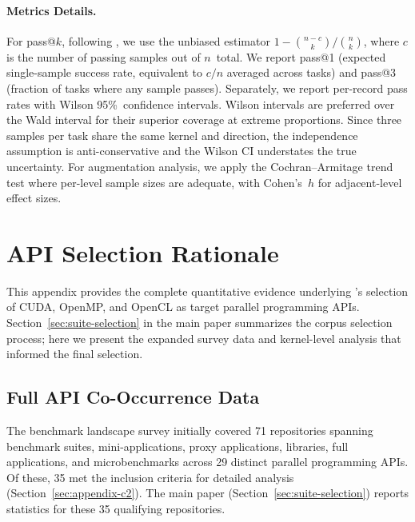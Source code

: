 \paragraph{Metrics Details.}
For pass@$k$, following \citet{HumanEval2021}, we use the unbiased estimator $1 - \binom{n-c}{k}/\binom{n}{k}$, where $c$ is the number of passing samples out of $n$~total. We report pass@1 (expected single-sample success rate, equivalent to $c/n$ averaged across tasks) and pass@3 (fraction of tasks where any sample passes).
Separately, we report per-record pass rates with Wilson 95\%~confidence intervals. Wilson intervals are preferred over the Wald interval for their superior coverage at extreme proportions. Since three samples per task share the same kernel and direction, the independence assumption is anti-conservative and the Wilson CI understates the true uncertainty. For augmentation analysis, we apply the Cochran--Armitage trend test where per-level sample sizes are adequate, with Cohen's~$h$ for adjacent-level effect sizes.


\section{API Selection Rationale}
\label{sec:appendix-b}

This appendix provides the complete quantitative evidence underlying \parbench{}'s selection of CUDA, OpenMP, and OpenCL as target parallel programming APIs. Section~\ref{sec:suite-selection} in the main paper summarizes the corpus selection process; here we present the expanded survey data and kernel-level analysis that informed the final selection.

\subsection{Full API Co-Occurrence Data}
\label{sec:appendix-b1}
The benchmark landscape survey initially covered 71 repositories spanning benchmark suites, mini-applications, proxy applications, libraries, full applications, and microbenchmarks across 29 distinct parallel programming APIs. Of these, 35 met the inclusion criteria for detailed analysis (Section~\ref{sec:appendix-c2}). The main paper (Section~\ref{sec:suite-selection}) reports statistics for these 35 qualifying repositories.

